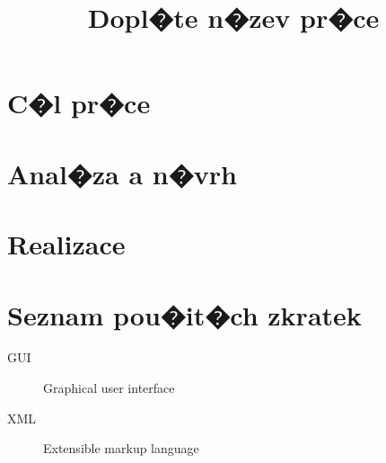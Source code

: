 \documentclass[thesis=M,czech]{FITthesis}[2012/06/26]
\title{Dopl�te n�zev pr�ce}
\begin{document}

\begin{introduction}
\end{introduction}

\chapter{C�l pr�ce}

\chapter{Anal�za a n�vrh}

\chapter{Realizace}

\begin{conclusion}
\end{conclusion}




\appendix

\chapter{Seznam pou�it�ch zkratek}
\begin{description}
	\item[GUI] Graphical user interface
	\item[XML] Extensible markup language
\end{description}
\end{document}
